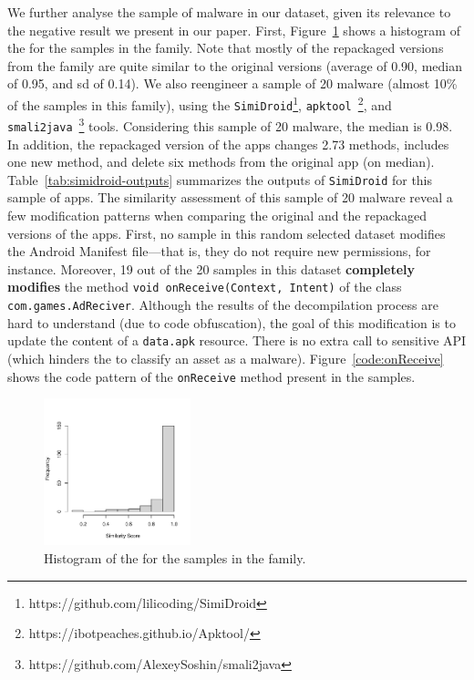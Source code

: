 We further analyse the sample of \gps malware in our dataset, given its
relevance to the negative result we present in our paper. First,
Figure~\ref{fig:hist-gappusin} shows a histogram of the \sscore for the samples
in the \gps family. Note that mostly of the repackaged versions from the
\gps family are quite similar to the original versions (average \sscore
of 0.90, median \sscore of 0.95, and sd of 0.14). We also reengineer
a sample of 20 \gps malware (almost 10\% of the samples in this
family), using the \texttt{SimiDroid}\footnote{https://github.com/lilicoding/SimiDroid},
\texttt{apktool}~\footnote{https://ibotpeaches.github.io/Apktool/},
and \texttt{smali2java}~\footnote{https://github.com/AlexeySoshin/smali2java} tools.
Considering this sample of 20 \gps malware, the median \sscore is 0.98. In addition,
the repackaged version of the apps changes 2.73 methods, includes one new method,
and delete six methods from the original app (on median). Table~\ref{tab:simidroid-outputs} summarizes
the outputs of \texttt{SimiDroid} for this sample of \gps apps. The similarity assessment
of this sample of 20 \gps malware reveal a few modification patterns when comparing the original and the
repackaged versions of the apps. First, no sample in this random selected \gps dataset
modifies the Android Manifest file---that is, they do not require new permissions, for instance.
Moreover, 19 out of the 20 samples in this dataset  {\bf completely modifies} the
method \texttt{void onReceive(Context, Intent)}
of the class \texttt{com.games.AdReciver}. Although the results of the
decompilation process are hard to understand (due to code obfuscation),
the goal of this modification is to update the content of a \texttt{data.apk}
resource. There is no extra call to sensitive API (which hinders the
\mas to classify an asset as a malware). Figure~\ref{code:onReceive} shows
the code pattern of the \texttt{onReceive} method present in the samples.  

\begin{figure}
\begin{center}
    \includegraphics[width=0.38\textwidth]{images/gappusin-1.pdf}
  \end{center}
  \caption{Histogram of the \sscore for the samples in the \gps family.}
  \label{fig:hist-gappusin}
\end{figure}  

